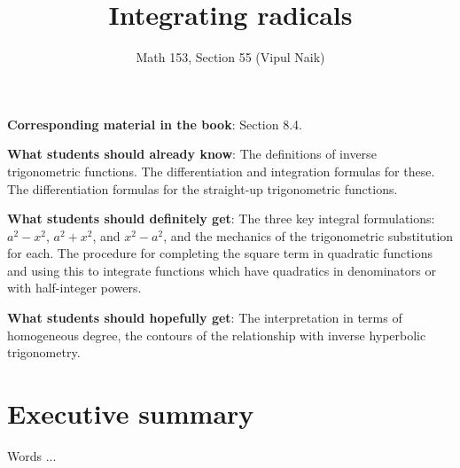 \documentclass[10pt]{amsart}
\title{Integrating radicals}
\author{Math 153, Section 55 (Vipul Naik)}
\begin{document}
\maketitle

{\bf Corresponding material in the book}: Section 8.4.

{\bf What students should already know}: The definitions of inverse
trigonometric functions. The differentiation and integration formulas
for these. The differentiation formulas for the straight-up
trigonometric functions.

{\bf What students should definitely get}: The three key integral
formulations: $a^2 - x^2$, $a^2 + x^2$, and $x^2 - a^2$, and the
mechanics of the trigonometric substitution for each. The procedure
for completing the square term in quadratic functions and using this
to integrate functions which have quadratics in denominators or with
half-integer powers.

{\bf What students should hopefully get}: The interpretation in terms
of homogeneous degree, the contours of the relationship with inverse
hyperbolic trigonometry.

\section*{Executive summary}

Words ...
\end{document}
